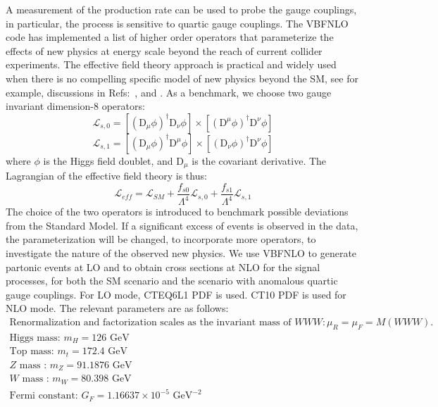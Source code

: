A measurement
of the production rate can be used to probe the gauge couplings, in
particular, the process is sensitive to quartic gauge couplings. The
{\sc VBFNLO } code has implemented a list of higher order operators
that parameterize the effects of new physics at energy scale beyond
the reach of current collider experiments.  The effective field theory
approach is practical and widely used when there is no compelling
specific model of new physics beyond the SM, see for example,
discussions in Refs:~\cite{Hagiwara:1993ck}, \cite{Buchmuller:1985jz}
and \cite{Eboli:2006wa}.  As a benchmark, we choose two gauge
invariant dimension-8 operators:
\begin{equation}
\mathcal{L}_{s,0} = [(\mathrm{D}_\mu\phi)^\dag\mathrm{D}_\nu \phi]\times [(\mathrm{D}^\mu\phi)^\dag\mathrm{D}^\nu \phi]
\end{equation}
\begin{equation}
\mathcal{L}_{s,1} = [(\mathrm{D}_\mu\phi)^\dag\mathrm{D}^\mu \phi]\times [(\mathrm{D}_\nu\phi)^\dag\mathrm{D}^\nu \phi]
\end{equation}
where $\phi$ is the Higgs field doublet, and $\mathrm{D}_\mu$ is the covariant derivative. 
The Lagrangian of the effective field theory is thus: 
\begin{equation}
\mathcal{L}_{eff} = \mathcal{L}_{SM} + \frac{f_{s0}}{\Lambda^4}\mathcal{L}_{s,0}+\frac{f_{s1}}{\Lambda^4}\mathcal{L}_{s,1}
\end{equation}
The choice of the two operators is introduced to benchmark possible
deviations from the Standard Model. If a significant excess of events is observed in the data, the parameterization will be changed, to incorporate more operators, to
investigate the nature of the observed new physics.
We use {\sc  VBFNLO} to generate partonic events at LO and to obtain cross
sections at NLO for the signal processes, for both the SM scenario and
the scenario with anomalous quartic gauge couplings. For LO mode,
CTEQ6L1 PDF is used. CT10 PDF is used for NLO mode.  The relevant
parameters are as follows:
\begin{gather}
\text{Renormalization and factorization scales as the invariant mass of }WWW:  \mu_R =\mu_F = M(WWW).\\
\text{Higgs mass:  } m_H = 126 \text{ GeV} \\
\text{Top mass:  } m_t = 172.4 \text{ GeV} \\
Z \text{ mass : } m_{Z} = 91.1876 \text{ GeV} \\
W \text{ mass : } m_W = 80.398 \text{ GeV} \\
\text{Fermi constant: } G_F = 1.16637\times 10^{-5} \text{ GeV}^{-2}
\end{gather} 

